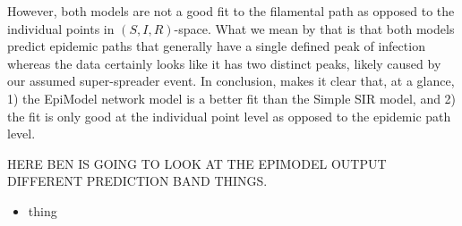 \documentclass[
  shortnames]{jss}
\begin{document}
However, both models are not a good fit to the filamental path as
opposed to the individual points in \((S, I, R)\)-space. What we mean by
that is that both models predict epidemic paths that generally have a
single defined peak of infection whereas the data certainly looks like
it has two distinct peaks, likely caused by our assumed super-spreader
event. In conclusion,  makes it clear that, at a glance,
1) the EpiModel network model is a better fit than the Simple SIR model,
and 2) the fit is only good at the individual point level as opposed to
the epidemic path level.

HERE BEN IS GOING TO LOOK AT THE EPIMODEL OUTPUT DIFFERENT PREDICTION
BAND THINGS.

\begin{itemize}
\item thing
\end{itemize}


\end{document}
